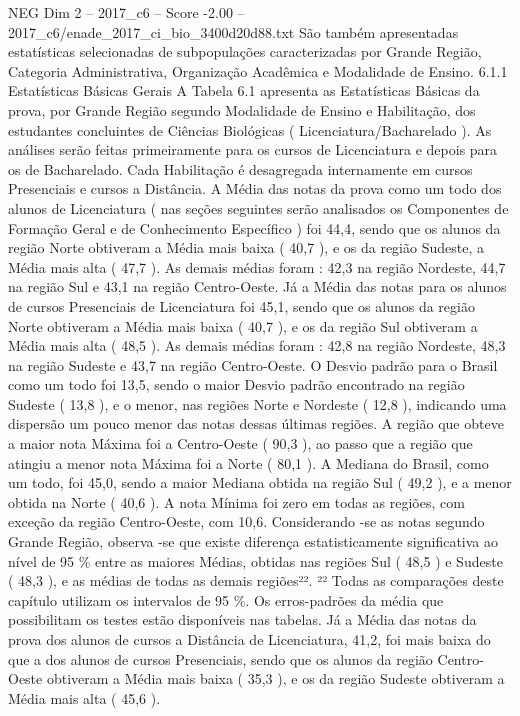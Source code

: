\begin{textsample}{NEG Dim 2 – 2017\_c6 – Score -2.00 – 2017\_c6/enade\_2017\_ci\_bio\_3400d20d88.txt}
São também apresentadas estatísticas selecionadas de subpopulações caracterizadas por Grande Região, Categoria Administrativa, Organização Acadêmica e Modalidade de Ensino. 6.1.1 Estatísticas Básicas Gerais A Tabela 6.1 apresenta as Estatísticas Básicas da prova, por Grande Região segundo Modalidade de Ensino e Habilitação, dos estudantes concluintes de Ciências Biológicas ( Licenciatura/Bacharelado ).
As análises serão feitas primeiramente para os cursos de Licenciatura e depois para os de Bacharelado.
Cada Habilitação é desagregada internamente em cursos Presenciais e cursos a Distância.
A Média das notas da prova como um todo dos alunos de Licenciatura ( nas seções seguintes serão analisados os Componentes de Formação Geral e de Conhecimento Específico ) foi 44,4, sendo que os alunos da região Norte obtiveram a Média mais baixa ( 40,7 ), e os da região Sudeste, a Média mais alta ( 47,7 ).
As demais médias foram : 42,3 na região Nordeste, 44,7 na região Sul e 43,1 na região Centro-Oeste.
Já a Média das notas para os alunos de cursos Presenciais de Licenciatura foi 45,1, sendo que os alunos da região Norte obtiveram a Média mais baixa ( 40,7 ), e os da região Sul obtiveram a Média mais alta ( 48,5 ).
As demais médias foram : 42,8 na região Nordeste, 48,3 na região Sudeste e 43,7 na região Centro-Oeste.
O Desvio padrão para o Brasil como um todo foi 13,5, sendo o maior Desvio padrão encontrado na região Sudeste ( 13,8 ), e o menor, nas regiões Norte e Nordeste ( 12,8 ), indicando uma dispersão um pouco menor das notas dessas últimas regiões.
A região que obteve a maior nota Máxima foi a Centro-Oeste ( 90,3 ), ao passo que a região que atingiu a menor nota Máxima foi a Norte ( 80,1 ).
A Mediana do Brasil, como um todo, foi 45,0, sendo a maior Mediana obtida na região Sul ( 49,2 ), e a menor obtida na Norte ( 40,6 ).
A nota Mínima foi zero em todas as regiões, com exceção da região Centro-Oeste, com 10,6.
Considerando -se as notas segundo Grande Região, observa -se que existe diferença estatisticamente significativa ao nível de 95 \% entre as maiores Médias, obtidas nas regiões Sul ( 48,5 ) e Sudeste ( 48,3 ), e as médias de todas as demais regiões²². ²² Todas as comparações deste capítulo utilizam os intervalos de 95 \%.
Os erros-padrões da média que possibilitam os testes estão disponíveis nas tabelas.
Já a Média das notas da prova dos alunos de cursos a Distância de Licenciatura, 41,2, foi mais baixa do que a dos alunos de cursos Presenciais, sendo que os alunos da região Centro-Oeste obtiveram a Média mais baixa ( 35,3 ), e os da região Sudeste obtiveram a Média mais alta ( 45,6 ).

\end{textsample}
